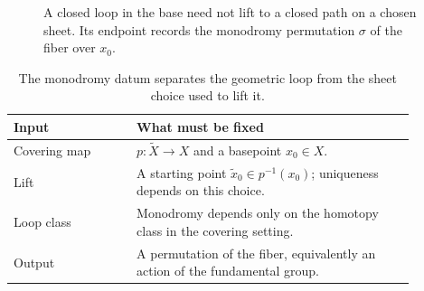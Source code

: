 \begin{figure}[htbp]
\centering
{}
\caption{A closed loop in the base need not lift to a closed path on a chosen sheet.
Its endpoint records the monodromy permutation $\sigma$ of the fiber over $x_0$.}
\label{fig:iv23-c07-monodromy-lift}
\end{figure}

\begin{table}[htbp]
\centering\small
\begin{tabular}{p{0.27\linewidth}p{0.61\linewidth}}
\toprule
Input & What must be fixed\\
\midrule
Covering map & $p:\widetilde X\to X$ and a basepoint $x_0\in X$.\\
Lift & A starting point $\widetilde x_0\in p^{-1}(x_0)$; uniqueness depends on this choice.\\
Loop class & Monodromy depends only on the homotopy class in the covering setting.\\
Output & A permutation of the fiber, equivalently an action of the fundamental group.\\
\bottomrule
\end{tabular}
\caption{The monodromy datum separates the geometric loop from the sheet choice used to lift it.}
\label{tab:iv23-c07-monodromy-data}
\end{table}
